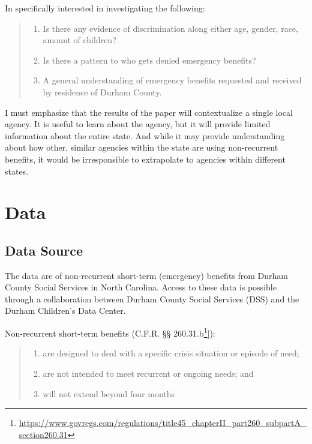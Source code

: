 \documentclass[12pt,letterpaperpaper,]{book}
\providecommand{\tightlist}{%
  \setlength{\itemsep}{0pt}\setlength{\parskip}{0pt}}
\renewcommand{\href}[2]{#2\footnote{\url{#1}}}
\begin{document}
In specifically interested in investigating the following:

\begin{quote}
\begin{enumerate}
\def\labelenumi{\arabic{enumi}.}
\tightlist
\item
  Is there any evidence of discrimination along either age, gender,
  race, amount of children?
\item
  Is there a pattern to who gets denied emergency benefits?
\item
  A general understanding of emergency benefits requested and received
  by residence of Durham County.
\end{enumerate}
\end{quote}

I must emphasize that the results of the paper will contextualize a
single local agency. It is useful to learn about the agency, but it will
provide limited information about the entire state. And while it may
provide understanding about how other, similar agencies within the state
are using non-recurrent benefits, it would be irresponsible to
extrapolate to agencies within different states.

\section*{Data}\label{data-2}

\subsection*{Data Source}\label{data-source}

The data are of non-recurrent short-term (emergency) benefits from
Durham County Social Services in North Carolina. Access to these data is
possible through a collaboration between Durham County Social Services
(DSS) and the Durham Children's Data Center.

Non-recurrent short-term benefits
(\href{https://www.govregs.com/regulations/title45_chapterII_part260_subpartA_section260.31}{C.F.R.
§§ 260.31.b}{]}):

\begin{quote}
\begin{enumerate}
\def\labelenumi{\arabic{enumi}.}
\tightlist
\item
  are designed to deal with a specific crisis situation or episode of
  need;
\item
  are not intended to meet recurrent or ongoing needs; and
\item
  will not extend beyond four months
\end{enumerate}
\end{quote}
\end{document}
